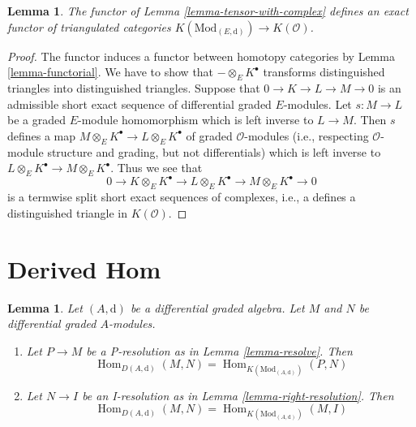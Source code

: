 \documentclass{stacks-project}
\theoremstyle{plain}
\newtheorem{lemma}[subsection]{Lemma}
\theoremstyle{definition}
\theoremstyle{remark}
\numberwithin{equation}{subsection}
\def\Hom{\mathop{\mathrm{Hom}}\nolimits}
\begin{document}
\begin{lemma}
\label{lemma-tensor-with-complex-homotopy}
The functor of Lemma \ref{lemma-tensor-with-complex} defines an exact functor
of triangulated categories
$K(\text{Mod}_{(E, \text{d})}) \to K(\mathcal{O})$.
\end{lemma}

\begin{proof}
The functor induces a functor between homotopy categories by
Lemma \ref{lemma-functorial}.
We have to show that $- \otimes_E K^\bullet$ transforms distinguished
triangles into distinguished triangles.
Suppose that $0 \to K \to L \to M \to 0$ is an admissible short
exact sequence of differential graded $E$-modules. Let $s : M \to L$ be
a graded $E$-module homomorphism which is left inverse to $L \to M$.
Then $s$ defines a map $M \otimes_E K^\bullet \to L \otimes_E K^\bullet$
of graded $\mathcal{O}$-modules (i.e., respecting $\mathcal{O}$-module
structure and grading, but not differentials)
which is left inverse to $L \otimes_E K^\bullet \to M \otimes_E K^\bullet$.
Thus we see that
$$
0 \to K \otimes_E K^\bullet \to L \otimes_E K^\bullet \to
M \otimes_E K^\bullet \to 0
$$
is a termwise split short exact sequences of complexes, i.e., a
defines a distinguished triangle in $K(\mathcal{O})$.
\end{proof}

\section{Derived Hom}
\label{section-restriction}

\begin{lemma}
\label{lemma-hom-derived}
Let $(A, \text{d})$ be a differential graded algebra.
Let $M$ and $N$ be differential graded $A$-modules.
\begin{enumerate}
\item Let $P \to M$ be a P-resolution as in
Lemma \ref{lemma-resolve}. Then
$$
\Hom_{D(A, \text{d})}(M, N) =
\Hom_{K(\text{Mod}_{(A, \text{d})})}(P, N)
$$
\item Let $N \to I$ be an I-resolution as in
Lemma \ref{lemma-right-resolution}. Then
$$
\Hom_{D(A, \text{d})}(M, N) =
\Hom_{K(\text{Mod}_{(A, \text{d})})}(M, I)
$$
\end{enumerate}
\end{lemma}
\end{document}
